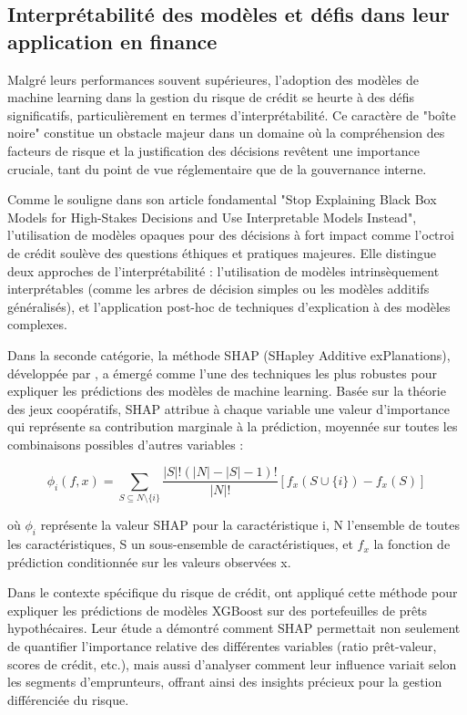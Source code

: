 \subsection{Interprétabilité des modèles et défis dans leur application en finance}

Malgré leurs performances souvent supérieures, l'adoption des modèles de machine learning dans la gestion du risque de crédit se heurte à des défis significatifs, particulièrement en termes d'interprétabilité. Ce caractère de "boîte noire" constitue un obstacle majeur dans un domaine où la compréhension des facteurs de risque et la justification des décisions revêtent une importance cruciale, tant du point de vue réglementaire que de la gouvernance interne.

Comme le souligne \citet{rudin2019} dans son article fondamental "Stop Explaining Black Box Models for High-Stakes Decisions and Use Interpretable Models Instead", l'utilisation de modèles opaques pour des décisions à fort impact comme l'octroi de crédit soulève des questions éthiques et pratiques majeures. Elle distingue deux approches de l'interprétabilité : l'utilisation de modèles intrinsèquement interprétables (comme les arbres de décision simples ou les modèles additifs généralisés), et l'application post-hoc de techniques d'explication à des modèles complexes.

Dans la seconde catégorie, la méthode SHAP (SHapley Additive exPlanations), développée par \citet{lundberg2017}, a émergé comme l'une des techniques les plus robustes pour expliquer les prédictions des modèles de machine learning. Basée sur la théorie des jeux coopératifs, SHAP attribue à chaque variable une valeur d'importance qui représente sa contribution marginale à la prédiction, moyennée sur toutes les combinaisons possibles d'autres variables :

\begin{equation}
\phi_i(f, x) = \sum_{S \subseteq N \setminus \{i\}} \frac{|S|!(|N|-|S|-1)!}{|N|!} [f_x(S \cup \{i\}) - f_x(S)]
\end{equation}

où $\phi_i$ représente la valeur SHAP pour la caractéristique i, N l'ensemble de toutes les caractéristiques, S un sous-ensemble de caractéristiques, et $f_x$ la fonction de prédiction conditionnée sur les valeurs observées x.

Dans le contexte spécifique du risque de crédit, \citet{bracke2019} ont appliqué cette méthode pour expliquer les prédictions de modèles XGBoost sur des portefeuilles de prêts hypothécaires. Leur étude a démontré comment SHAP permettait non seulement de quantifier l'importance relative des différentes variables (ratio prêt-valeur, scores de crédit, etc.), mais aussi d'analyser comment leur influence variait selon les segments d'emprunteurs, offrant ainsi des insights précieux pour la gestion différenciée du risque.


